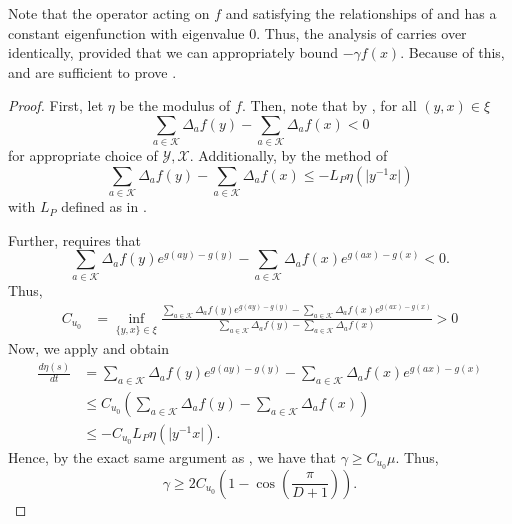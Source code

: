 Note that the operator acting on $f$ and satisfying the relationships of  and  has a constant eigenfunction with eigenvalue $0$. Thus, the analysis of  carries over identically, provided that we can appropriately bound $-\gamma f(x)$. Because of this,  and  are sufficient to prove .

\Dirichlet*
\begin{proof}
First, let $\eta$ be the modulus of $f$. Then, note that by , for all $(y,x) \in \xi$ 
\begin{equation*}
	\sum_{a\in\mathcal{K}}\Delta_a f(y)-\sum_{a\in\mathcal{K}}\Delta_a f(x) < 0
\end{equation*}
for appropriate choice of $\mathcal{Y},\mathcal{X}$. Additionally, by the method of 
\begin{equation*}
	\sum_{a\in\mathcal{K}}\Delta_a f(y)-\sum_{a\in\mathcal{K}}\Delta_a f(x) \leq -L_P \eta(\lvert y^{-1} x \rvert )
\end{equation*}
with $L_P$ defined as in . 

Further,  requires that
\begin{equation*}
\sum_{a\in\mathcal{K}}\Delta_a f(y)e^{g(ay)-g(y)}-\sum_{a\in\mathcal{K}}\Delta_a f(x) e^{g(ax)-g(x)} < 0.
\end{equation*}
Thus, 
\begin{align*}
	C_{u_0} &= \inf_{\{y,x\}\in \xi}\frac{\displaystyle \sum_{a\in\mathcal{K}}\Delta_a f(y)e^{g(ay)-g(y)} -\sum_{a\in\mathcal{K}}\Delta_a f(x) e^{g(ax)-g(x)}}{\displaystyle\sum_{a\in\mathcal{K}}\Delta_a f(y)-\sum_{a\in\mathcal{K}}\Delta_a f(x)} >0
\end{align*}
Now, we apply  and obtain
\begin{align*}
    \frac{d \eta(s)}{dt} &= \sum_{a\in\mathcal{K}}\Delta_a f(y)e^{g(ay)-g(y)}-\sum_{a\in\mathcal{K}}\Delta_a f(x)e^{g(ax)-g(x)} \\
    &\leq C_{u_0} \left(\sum_{a\in\mathcal{K}}\Delta_a f(y)-\sum_{a\in\mathcal{K}}\Delta_a f(x)\right) \\
    &\leq -C_{u_0} L_P \eta(\lvert y^{-1}x \rvert).
\end{align*}
Hence, by the exact same argument as , we have that $\gamma \geq C_{u_0} \mu$. Thus,
\begin{equation*}
		\gamma \geq 2 C_{u_0} \left(1-\cos\left(\frac{\pi}{D+1} \right)\right).
\end{equation*}
\end{proof} 

